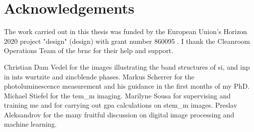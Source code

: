 \chapter{Acknowledgements}

The work carried out in this thesis was funded by the European Union's Horizon 2020 project "\acl{design}" (\acs{design}) with grant number 860095 \cite{CordisDESIGN}. I thank the Cleanroom Operations Team of the \acl{brnc} for their help and support. 

Christian Dam Vedel for the images illustrating the band structures of \acs{si}, and \acs{inp} in ints wurtzite and zincblende phases.
Markus Scherrer for the photoluminescence measurement and his guidance in the first months of my PhD. 
Michael Stiefel for the \acs{tem_m} imaging. 
Marilyne Sousa for supervising and training me and for carrying out \acs{gpa} calculations on \acs{stem_m} images. 
Preslav Aleksandrov for the many fruitful discussion on digital image processing and machine learning.